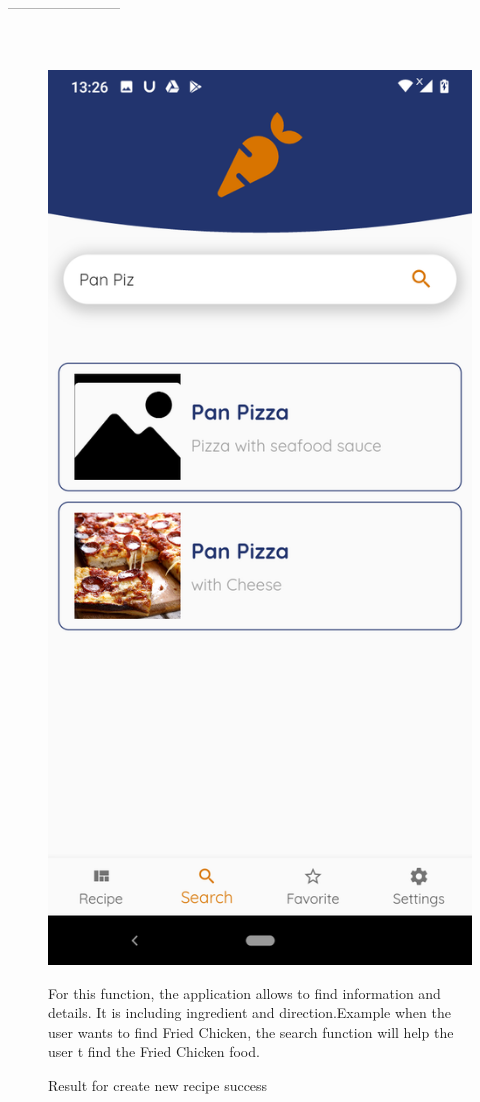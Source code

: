 \documentclass{article}
\begin{document}
      ------------------------\\ \\ \\
    \begin{figure}[h!]
    \centering
    \includegraphics[scale=0.1]{Images/Search.jpg}
    \caption{Result for create new recipe success}
    \label{fig:cookingbook}
    For this function, the application allows to find information and details. It is including ingredient and direction.Example when the user wants to find Fried Chicken, the search function will help the user t find the Fried Chicken food.
    \end{figure}
\end{document}
